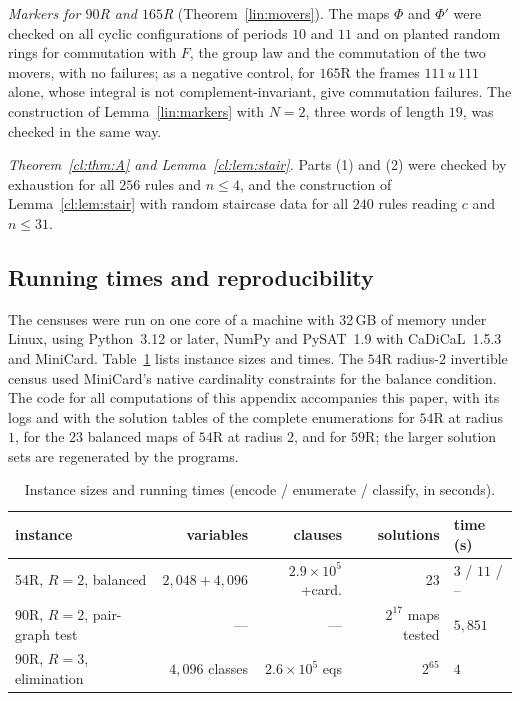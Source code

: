 \emph{Markers for $90$R and $165$R} (Theorem~\ref{lin:movers}). The maps $\Phi$ and $\Phi'$ were checked on all cyclic configurations of periods $10$ and $11$ and on planted random rings for commutation with $F$, the group law and the commutation of the two movers, with no failures; as a negative control, for $165$R the frames $111\,u\,111$ alone, whose integral is not complement-invariant, give commutation failures. The construction of Lemma~\ref{lin:markers} with $N=2$, three words of length $19$, was checked in the same way.

\emph{Theorem~\ref{cl:thm:A} and Lemma~\ref{cl:lem:stair}.} Parts (1) and (2) were checked by exhaustion for all $256$ rules and $n\le4$, and the construction of Lemma~\ref{cl:lem:stair} with random staircase data for all $240$ rules reading $c$ and $n\le31$.

\subsection{Running times and reproducibility}\label{app:repro}

The censuses were run on one core of a machine with 32\,GB of memory under Linux, using Python~3.12 or later, NumPy and PySAT~1.9 with CaDiCaL~1.5.3 and MiniCard. Table~\ref{tab:times} lists instance sizes and times. The $54$R radius-$2$ invertible census used MiniCard's native cardinality constraints for the balance condition. The code for all computations of this appendix accompanies this paper, with its logs and with the solution tables of the complete enumerations for $54$R at radius $1$, for the $23$ balanced maps of $54$R at radius $2$, and for $59$R; the larger solution sets are regenerated by the programs.

\begin{table}[h]
\caption{Instance sizes and running times (encode / enumerate / classify, in seconds).}
\label{tab:times}
\centering
\begin{tabular}{lrrrl}
\toprule
instance & variables & clauses & solutions & time (s)\\
\midrule
54R, $R=2$, balanced & $2{,}048+4{,}096$ & $2.9\times10^5$+card. & 23 & $3$ / $11$ / --\\
90R, $R=2$, pair-graph test & --- & --- & $2^{17}$ maps tested & $5{,}851$\\
90R, $R=3$, elimination & $4{,}096$ classes & $2.6\times10^5$ eqs & $2^{65}$ & $4$\\
\bottomrule
\end{tabular}
\end{table}
